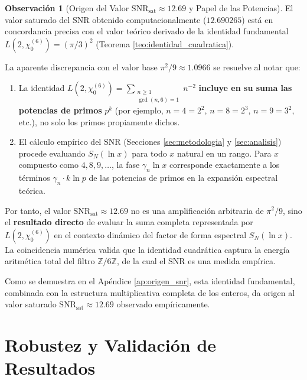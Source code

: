 \documentclass[12pt, a4paper]{article}
\theoremstyle{plain}
\theoremstyle{definition}
\newtheorem{observacion}[teorema]{Observación}
\theoremstyle{remark}
\begin{document}
\begin{observacion}[Origen del Valor $\mathrm{SNR}_{\mathrm{sat}} \approx 12.69$ y Papel de las Potencias]
El valor saturado del SNR obtenido computacionalmente ($12.690265$) está en concordancia precisa con el valor teórico derivado de la identidad fundamental $L(2, \chi_0^{(6)}) = (\pi/3)^2$ (Teorema \ref{teo:identidad_cuadratica}).

La aparente discrepancia con el valor base $\pi^2/9 \approx 1.0966$ se resuelve al notar que:
\begin{enumerate}
    \item La identidad $L(2, \chi_0^{(6)}) = \sum_{\substack{n \geq 1 \\ \gcd(n,6)=1}} n^{-2}$ \textbf{incluye en su suma las potencias de primos} $p^k$ (por ejemplo, $n=4=2^2$, $n=8=2^3$, $n=9=3^2$, etc.), no solo los primos propiamente dichos.
    \item El cálculo empírico del SNR (Secciones \ref{sec:metodologia} y \ref{sec:analisis}) procede evaluando $S_N(\ln x)$ para todo $x$ natural en un rango. Para $x$ compuesto como $4, 8, 9,\dots$, la fase $\gamma_n \ln x$ corresponde exactamente a los términos $\gamma_n \cdot k \ln p$ de las potencias de primos en la expansión espectral teórica.
\end{enumerate}
Por tanto, el valor $\mathrm{SNR}_{\mathrm{sat}} \approx 12.69$ no es una amplificación arbitraria de $\pi^2/9$, sino el \textbf{resultado directo} de evaluar la suma completa representada por $L(2, \chi_0^{(6)})$ en el contexto dinámico del factor de forma espectral $S_N(\ln x)$. La coincidencia numérica valida que la identidad cuadrática captura la energía aritmética total del filtro $\mathbb{Z}/6\mathbb{Z}$, de la cual el SNR es una medida empírica.
\end{observacion}

Como se demuestra en el Apéndice \ref{ap:origen_snr}, esta identidad fundamental, combinada con la estructura multiplicativa completa de los enteros, da origen al valor saturado $\mathrm{SNR}_{\mathrm{sat}} \approx 12.69$ observado empíricamente.


\section{Robustez y Validación de Resultados}
\label{sec:robustez}
\end{document}
